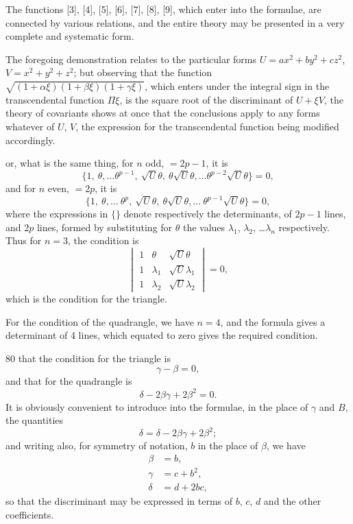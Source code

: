 \documentclass[11pt,a4paper]{article}
\theoremstyle{plain}
\theoremstyle{definition}
\theoremstyle{remark}
\begin{document}
The functions [3], [4], [5], [6], [7], [8], [9], which enter into the formulae, are connected by various relations, and the entire theory may be presented in a very complete and systematic form.

\newpage
\setcounter{page}{318}

The foregoing demonstration relates to the particular forms $U=ax^2+by^2+cz^2$, $V=x^2+y^2+z^2$; but observing that the function $\sqrt{(1+\alpha\xi)(1+\beta\xi)(1+\gamma\xi)}$, which enters under the integral sign in the transcendental function $\Pi\xi$, is the square root of the discriminant of $U+\xi V$, the theory of covariants shows at once that the conclusions apply to any forms whatever of $U$, $V$, the expression for the transcendental function being modified accordingly.

or, what is the same thing, for $n$ odd, $=2p-1$, it is
\[
\{1,\ \theta,\dots\theta^{p-1},\ \surd U\theta,\ \theta\surd U\theta,\dots\theta^{p-2}\surd U\theta\} = 0,
\]
and for $n$ even, $=2p$, it is
\[
\{1,\ \theta,\dots\ \theta^p,\ \surd U\theta,\ \theta\surd U\theta,\dots\ \theta^{p-1}\surd U\theta\} = 0,
\]
where the expressions in $\{\}$ denote respectively the determinants, of $2p-1$ lines, and $2p$ lines, formed by substituting for $\theta$ the values $\lambda_1$, $\lambda_2$, \dots$\lambda_n$ respectively. Thus for $n=3$, the condition is
\[
\begin{vmatrix}
1 & \theta & \surd U\theta \\
1 & \lambda_1 & \surd U\lambda_1 \\
1 & \lambda_2 & \surd U\lambda_2
\end{vmatrix} = 0,
\]
which is the condition for the triangle.

\newpage
\setcounter{page}{319}

For the condition of the quadrangle, we have $n=4$, and the formula gives a determinant of 4 lines, which equated to zero gives the required condition.

80 that the condition for the triangle is
\[
\gamma-\beta=0,
\]
and that for the quadrangle is
\[
\delta-2\beta\gamma+2\beta^2=0.
\]
It is obviously convenient to introduce into the formulae, in the place of $\gamma$ and $B$, the quantities
\[
\delta = \delta-2\beta\gamma+2\beta^2;
\]
and writing also, for symmetry of notation, $b$ in the place of $\beta$, we have
\begin{align*}
\beta &= b,\\
\gamma &= c+b^2,\\
\delta &= d+2bc,
\end{align*}
so that the discriminant may be expressed in terms of $b$, $c$, $d$ and the other coefficients.
\end{document}
